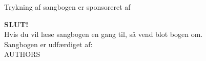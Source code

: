 \documentclass[a4paper,11pt,oneside,openany]{book}
\begin{document}
\newpage
\pagecolor{covercolor}

\pagestyle{empty}
\begin{center}

  {\large\textcolor{backcolor}{Trykning af sangbogen er sponsoreret af \vspace{2cm}}} \\


  \vspace{7cm}

  {\Huge \textbf{\textcolor{backcolor}{SLUT!}}}\\
  {\large\textcolor{backcolor}{ Hvis du vil læse sangbogen en gang til, så vend blot bogen
      om.}}\\
  \vspace{0.5cm}
  \textcolor{backcolor}{Sangbogen er udfærdiget af:\\
    {{AUTHORS}}}
\end{center}
\end{document}
